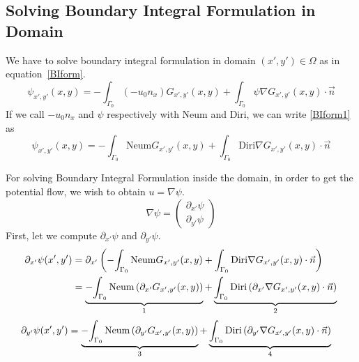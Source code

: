 \documentclass[a4paper,12pt]{article}
\newcommand{\integ}[3]{%
\ensuremath{\displaystyle{\int^{#2}_{#1} #3}}}
\begin{document}
\subsection{Solving Boundary Integral Formulation in Domain}

We have to solve boundary integral formulation in domain $(x',y')\in \Omega$ as in equation~\eqref{BIform}. 
\begin{equation}
 \psi_{x',y'}(x,y)=-\integ{\Gamma_0}{}{(-u_0 n_x)G_{x',y'}(x,y)} + \integ{\Gamma_0}{}{\psi\nabla G_{x',y'}(x,y)\cdot \vec{n}} \label{BIform1}
\end{equation}
If we call $-u_0 n_x$ and $\psi$ respectively with Neum and Diri, we can write \ref{BIform1} as
\begin{equation}
 \psi_{x',y'}(x,y)=-\integ{\Gamma_0}{}{\text{Neum}G_{x',y'}(x,y)} + \integ{\Gamma_0}{}{\text{Diri}\nabla G_{x',y'}(x,y)\cdot \vec{n}}
\end{equation}

For solving Boundary Integral Formulation inside the domain, in order to get the potential flow, we wish to obtain $u=\nabla\psi$.
\begin{equation}
 \nabla\psi=\left(\begin{array}{c}
      \partial_{x'}\psi \\
      \partial_{y'}\psi
    \end{array}\right)
\end{equation}
First, let we compute $\partial_{x'}\psi$ and $\partial_{y'}\psi$.
\begin{align}
 \partial_{x'}\psi(x',y')&=\partial_{x'}\left(-\integ{\Gamma_0}{}{\text{Neum}G_{x',y'}(x,y)} + \integ{\Gamma_0}{}{\text{Diri}\nabla G_{x',y'}(x,y)\cdot \vec{n}} \right)\\
&=  \underbrace{-\integ{\Gamma_0}{}{\text{Neum} \left(\partial_{x'}G_{x',y'}(x,y)\right)}}_\text{1}  +  
\underbrace{\integ{\Gamma_0}{}{\text{Diri}\left(\partial_{x'}\nabla G_{x',y'}(x,y)\cdot \vec{n}\right)}}_\text{2} 
\end{align}
\begin{align}
 \partial_{y'}\psi(x',y')&=  \underbrace{-\integ{\Gamma_0}{}{\text{Neum} \left(\partial_{y'}G_{x',y'}(x,y)\right)}}_\text{3}  +  
\underbrace{\integ{\Gamma_0}{}{\text{Diri}\left(\partial_{y'}\nabla G_{x',y'}(x,y)\cdot \vec{n}\right)}}_\text{4} 
\end{align}
\end{document}
